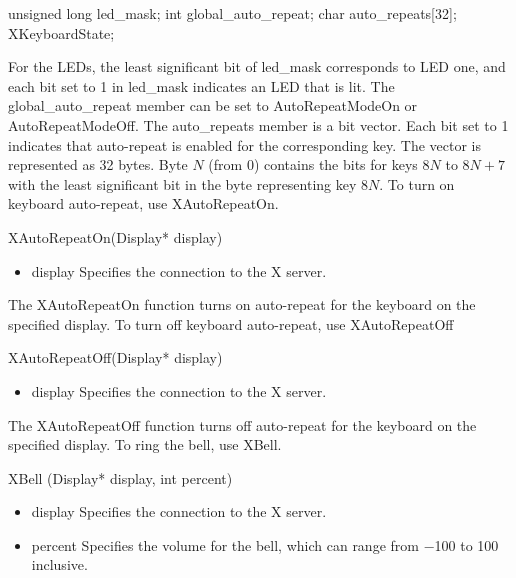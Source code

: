 \documentclass{report}
\begin{document}
\begin{itemize}
\begin{itemize}
\begin{cppcode}
{                    unsigned long led_mask;
                    int global_auto_repeat;
                    char auto_repeats[32];
                } XKeyboardState;  
            \end{cppcode}
            \bigbreak \noindent 
            For the LEDs, the least significant bit of led\_mask corresponds to LED one, and each bit set to 1 in led\_mask indicates an LED that is lit. The global\_auto\_repeat member can be set to AutoRepeatModeOn or AutoRepeatModeOff. The auto\_repeats member is a bit vector. Each bit set to 1 indicates that auto-repeat is enabled for the corresponding key. The vector is represented as 32 bytes. Byte $N$ (from 0) contains the bits for keys $8N$ to $8N + 7$ with the least significant bit in the byte representing key $8N$.
            \bigbreak \noindent 
            To turn on keyboard auto-repeat, use XAutoRepeatOn.
            \bigbreak \noindent 
            \begin{cppcode}
                XAutoRepeatOn(Display* display)
            \end{cppcode}
            \begin{itemize}
                \item display Specifies the connection to the X server.
            \end{itemize}
            The XAutoRepeatOn function turns on auto-repeat for the keyboard on the specified display.
            \bigbreak \noindent 
            To turn off keyboard auto-repeat, use XAutoRepeatOff
            \bigbreak \noindent 
            \begin{cppcode}
                XAutoRepeatOff(Display* display)
            \end{cppcode}
            \begin{itemize}
                \item display Specifies the connection to the X server.
            \end{itemize}
            The XAutoRepeatOff function turns off auto-repeat for the keyboard on the specified display.
            \bigbreak \noindent 
            To ring the bell, use XBell.
            \bigbreak \noindent 
            \begin{cppcode}
            XBell (Display* display, int percent)
            \end{cppcode}
            \begin{itemize}
                \item display Speciﬁes the connection to the X server.
                \item percent Speciﬁes the volume for the bell, which can range from −100 to 100 inclusive.

\end{itemize}
\end{itemize}
\end{itemize}
\end{document}
